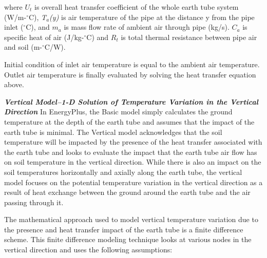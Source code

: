 where \(U_{t}\) is overall heat transfer coefficient of the whole earth tube system (W/m-\(^{\circ}\)C), \emph{T\(_{a}\)(y)} is air temperature of the pipe at the distance y from the pipe inlet (\(^{\circ}\)C), and \(m_{a}\) is mass flow rate of ambient air through pipe (kg/s).  \(C_{a}\) is specific heat of air (J/kg-\(^{\circ}\)C) and \(R_{t}\) is total thermal resistance between pipe air and soil (m-\(^{\circ}\)C/W).

Initial condition of inlet air temperature is equal to the ambient air temperature. Outlet air temperature is finally evaluated by solving the heat transfer equation above.

\emph{\textbf{Vertical Model--1-D Solution of Temperature Variation in the Vertical Direction}}
In EnergyPlus, the Basic model simply calculates the ground temperature at the depth of the earth tube and assumes that the impact of the earth tube is minimal. The Vertical model acknowledges that the soil temperature will be impacted by the presence of the heat transfer associated with the earth tube and looks to evaluate the impact that the earth tube air flow has on soil temperature in the vertical direction.  While there is also an impact on the soil temperatures horizontally and axially along the earth tube, the vertical model focuses on the potential temperature variation in the vertical direction as a result of heat exchange between the ground around the earth tube and the air passing through it.

The mathematical approach used to model vertical temperature variation due to the presence and heat transfer impact of the earth tube is a finite difference scheme.  This finite difference modeling technique looks at various nodes in the vertical direction and uses the following assumptions:

